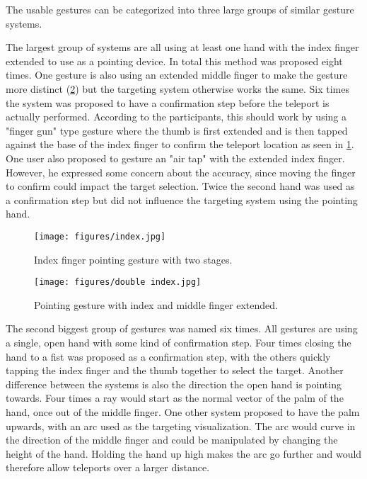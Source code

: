 The usable gestures can be categorized into three large groups of similar gesture systems. 

The largest group of systems are all using at least one hand with the index finger extended to use as a pointing device. In total this method was proposed eight times. One gesture is also using an extended middle finger to make the gesture more distinct (\ref{fig:index2}) but the targeting system otherwise works the same. Six times the system was proposed to have a confirmation step before the teleport is actually performed. According to the participants, this should work by using a "finger gun" type gesture where the thumb is first extended and is then tapped against the base of the index finger to confirm the teleport location as seen in \ref{fig:index}. One user also proposed to gesture an "air tap" with the extended index finger. However, he expressed some concern about the accuracy, since moving the finger to confirm could impact the target selection. Twice the second hand was used as a confirmation step but did not influence the targeting system using the pointing hand.

\begin{figure}[!h]
    \centering
    \texttt{[image: figures/index.jpg]}
    \caption{Index finger pointing gesture with two stages.}
    \label{fig:index}
\end{figure}

\begin{figure}[!h]
    \centering
    \texttt{[image: figures/double index.jpg]}
    \caption{Pointing gesture with index and middle finger extended.}
    \label{fig:index2}
\end{figure}

The second biggest group of gestures was named six times. All gestures are using a single, open hand with some kind of confirmation step. Four times closing the hand to a fist was proposed as a confirmation step, with the others quickly tapping the index finger and the thumb together to select the target. Another difference between the systems is also the direction the open hand is pointing towards. Four times a ray would start as the normal vector of the palm of the hand, once out of the middle finger. One other system proposed to have the palm upwards, with an arc used as the targeting visualization. The arc would curve in the direction of the middle finger and could be manipulated by changing the height of the hand. Holding the hand up high makes the arc go further and would therefore allow teleports over a larger distance.

